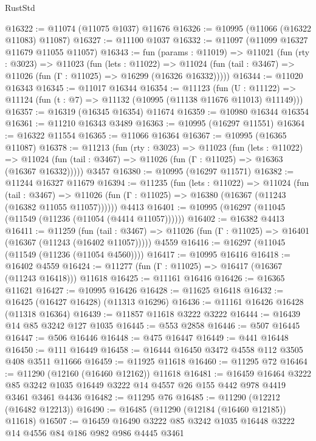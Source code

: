 \begin{lexlean}{RustStd}
\begin{coremodule}
@16322 := @11074 (@11075 @1037) @11676
@16326 := @10995 (@11066 (@16322 @11083) @11087)
@16327 := @11100 @1037
@16332 := @11097 (@11099 @16327 @11679 @11055 @11057)
@16343 := fun (params : @11019) =>
  @11021
    (fun (rty : @3023) =>
    @11023
      (fun (lets : @11022) =>
      @11024 (fun (tail : @3467) => @11026 (fun (Γ : @11025) => @16299 (@16326 @16332)))))
@16344 := @11020 @16343
@16345 := @11017 @16344
@16354 := @11123
    (fun (U : @11122) => @11124 (fun (t : @7) => @11132 (@10995 (@11138 @11676 @11013) @11149)))
@16357 := @16319 (@16345 @16354) @11674
@16359 := @10980 @16344 @16354
@16361 := @11210 @16343 @3489
@16363 := @10995 (@16297 @11551)
@16364 := @16322 @11554
@16365 := @11066 @16364
@16367 := @10995 (@16365 @11087)
@16378 := @11213
    (fun (rty : @3023) =>
    @11023
      (fun (lets : @11022) =>
      @11024 (fun (tail : @3467) => @11026 (fun (Γ : @11025) => @16363 (@16367 @16332)))))
    @3457
@16380 := @10995 (@16297 @11571)
@16382 := @11244 @16327 @11679
@16394 := @11235
    (fun (lets : @11022) =>
    @11024
      (fun (tail : @3467) =>
      @11026 (fun (Γ : @11025) => @16380 (@16367 (@11243 (@16382 @11055 @11057))))))
    @4413
@16401 := @10995 (@16297 (@11045 (@11549 (@11236 (@11054 (@4414 @11057))))))
@16402 := @16382 @4413
@16411 := @11259
    (fun (tail : @3467) => @11026 (fun (Γ : @11025) => @16401 (@16367 (@11243 (@16402 @11057)))))
    @4559
@16416 := @16297 (@11045 (@11549 (@11236 (@11054 @4560))))
@16417 := @10995 @16416
@16418 := @16402 @4559
@16424 := @11277 (fun (Γ : @11025) => @16417 (@16367 (@11243 @16418))) @11618
@16425 := @11161 @16416
@16426 := @16365 @11621
@16427 := @10995 @16426
@16428 := @11625 @16418
@16432 := @16425 (@16427 @16428) (@11313 @16296)
@16436 := @11161 @16426 @16428 (@11318 @16364)
@16439 := @11857 @11618 @3222 @3222
@16444 := @16439 @14 @85 @3242 @127 @1035
@16445 := @553 @2858
@16446 := @507 @16445
@16447 := @506 @16446
@16448 := @475 @16447
@16449 := @441 @16448
@16450 := @111 @16449
@16458 := @16444 @16450 @3472 @4558 @112 @3505 @408 @3511 @11666
@16459 := @11925 @11618
@16460 := @11295 @72
@16464 := @11290 (@12160 (@16460 @12162)) @11618
@16481 := @16459
    @16464
    @3222
    @85
    @3242
    @1035
    @16449
    @3222
    @14
    @4557
    @26
    @155
    @442
    @978
    @4419
    @3461
    @3461
    @4436
@16482 := @11295 @76
@16485 := @11290 (@12212 (@16482 @12213))
@16490 := @16485 (@11290 (@12184 (@16460 @12185)) @11618)
@16507 := @16459
    @16490
    @3222
    @85
    @3242
    @1035
    @16448
    @3222
    @14
    @4556
    @84
    @186
    @982
    @986
    @4445
    @3461

\end{coremodule}
\end{lexlean}
